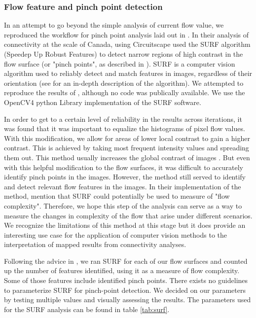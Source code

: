 \subsubsection*{Flow feature and pinch point detection}

In an attempt to go beyond the simple analysis of current flow value, we reproduced the workflow for pinch point analysis laid out in \cite{pelletier_forest_2017}. In their analysis of connectivity at the scale of Canada, using Circuitscape \citeauthor{pelletier_forest_2017} used the SURF algorithm (Speedep Up Robust Features) to detect narrow regions of high contrast in the flow surface (or "pinch points", as described in \cite{mcrae_using_2008}). SURF is a computer vision algorithm used to reliably detect and match features in images, regardless of their orientation (see \cite{leonardis_surf_2006} for an in-depth description of the algorithm). We attempted to reproduce the results of \citeauthor{pelletier_forest_2017}, although no code was publically available. We use the OpenCV4 python Library implementation of the SURF software.

In order to get to a certain level of reliability in the results across iterations, it was found that it was important to equalize the histograms of pixel flow values. With this modification, we allow for areas of lower local contrast to gain a higher contrast. This is achieved by taking most frequent intensity values and spreading them out. This method usually increases the global contrast of images \citep{garg_comparative_2017}. But even with this helpful modification to the flow surfaces, it was difficult to accurately identify pinch points in the images. However, the method still served to identify and detect relevant flow features in the images. In their implementation of the method, \citeauthor{pelletier_forest_2017} mention that SURF could potentially be used to measure of "flow complexity". Therefore, we hope this step of the analysis can serve as a way to measure the changes in complexity of the flow that arise under different scenarios. We recognize the limitations of this method at this stage but it does provide an interesting use case for the application of computer vision methods to the interpretation of mapped results from connectivity analyses.

Following the advice in \citeauthor{pelletier_forest_2017}, we ran SURF for each of our flow surfaces and counted up the number of features identified, using it as a measure of flow complexity. Some of those features include identified pinch points. There exists no guidelines to parameterize SURF for pinch-point detection. We decided on our parameters by testing multiple values and visually assessing the results. The parameters used for the SURF analysis can be found in table \ref{tab:surf}.\\

